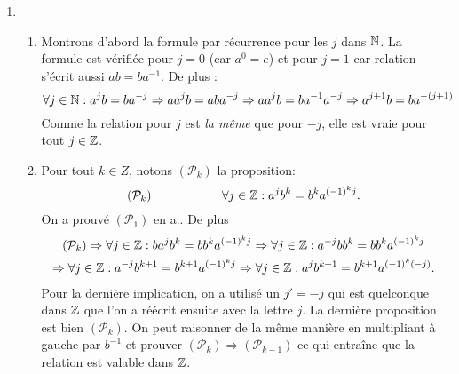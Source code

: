 \begin{enumerate}
 \item 
\begin{enumerate}
 \item Montrons d'abord la formule par récurrence pour les $j$ dans $\mathbb{N}$.\newline
La formule est vérifiée pour $j=0$ (car $a^0=e$) et pour $j=1$ car relation s'écrit aussi $ab=ba^{-1}$. 
De plus :
\begin{displaymath}
 \forall j \in \mathbb{N} : a^jb=ba^{-j} \Rightarrow aa^jb = aba^{-j}\Rightarrow aa^jb = ba^{-1}a^{-j}
\Rightarrow a^{j+1}b = b a^{-(j+1)}
\end{displaymath}
Comme la relation pour $j$ est \emph{la même} que pour $-j$, elle est vraie pour tout $j\in \mathbb{Z}$.
\item Pour tout $k\in Z$, notons $(\mathcal P_k)$ la proposition:
\begin{displaymath}
 (\mathcal P_k) \hspace{2cm}  \forall j\in \mathbb{Z} : a^j b^k = b^k a^{(-1)^k j}.
\end{displaymath}
On a prouvé $(\mathcal P_1)$ en a.. De plus
\begin{multline*}
 (\mathcal P_k)\Rightarrow \forall j\in \mathbb{Z} : ba^j b^k = bb^k a^{(-1)^k j}
\Rightarrow \forall j\in \mathbb{Z} : a^{-j}b b^k = bb^k a^{(-1)^k j} \\
\Rightarrow \forall j\in \mathbb{Z} : a^{-j}b^{k+1} = b^{k+1} a^{(-1)^k j}
\Rightarrow \forall j\in \mathbb{Z} : a^{j}b^{k+1} = b^{k+1} a^{(-1)^k (-j)}.
\end{multline*}
Pour la dernière implication, on a utilisé un $j'=-j$ qui est quelconque dans $\mathbb{Z}$ que l'on a réécrit ensuite avec la lettre $j$. La dernière proposition est bien $(\mathcal P_k)$.\newline
On peut raisonner de la même manière en multipliant à gauche par $b^{-1}$ et prouver $(\mathcal P_k) \Rightarrow (\mathcal P_{k-1})$ ce qui entraîne que la relation est valable dans $\mathbb{Z}$.
\end{enumerate}


\end{enumerate}
